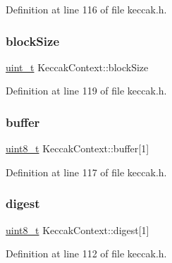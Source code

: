 Definition at line 116 of file keccak.\+h.

\mbox{\label{structKeccakContext_ae7a33ebbbcdcc2f688293684dfac9bc5}} 
\subsubsection{\texorpdfstring{block\+Size}{blockSize}}
{\footnotesize\ttfamily \hyperlink{compiler__port_8h_a12a1e9b3ce141648783a82445d02b58d}{uint\+\_\+t} Keccak\+Context\+::block\+Size}



Definition at line 119 of file keccak.\+h.

\mbox{\label{structKeccakContext_a449097a035be46c58179fa9a33f81bd6}} 
\subsubsection{\texorpdfstring{buffer}{buffer}}
{\footnotesize\ttfamily \hyperlink{stdint_8h_aba7bc1797add20fe3efdf37ced1182c5}{uint8\+\_\+t} Keccak\+Context\+::buffer\mbox{[}1\mbox{]}}



Definition at line 117 of file keccak.\+h.

\mbox{\label{structKeccakContext_a4196dad6ace978207ffd2013474e4062}} 
\subsubsection{\texorpdfstring{digest}{digest}}
{\footnotesize\ttfamily \hyperlink{stdint_8h_aba7bc1797add20fe3efdf37ced1182c5}{uint8\+\_\+t} Keccak\+Context\+::digest\mbox{[}1\mbox{]}}



Definition at line 112 of file keccak.\+h.

\mbox{\label{structKeccakContext_aa29155c613493a5da2480aad142ebc96}} 
